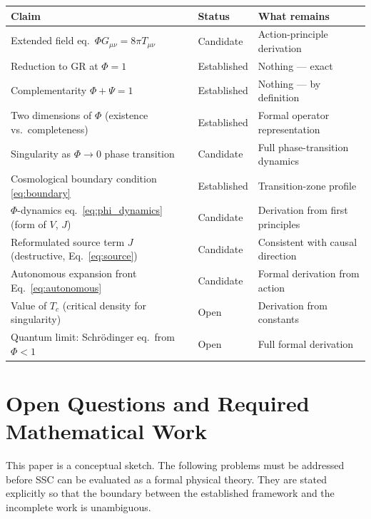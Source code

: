 \documentclass[12pt,a4paper]{article}
\begin{document}
\begin{center}
\renewcommand{\arraystretch}{1.35}
\begin{tabular}{p{5.2cm} l p{5.5cm}}
\toprule
\textbf{Claim} & \textbf{Status} & \textbf{What remains}\\
\midrule
Extended field eq.\ $\Phi G_{\mu\nu} = 8\pi T_{\mu\nu}$
  & Candidate & Action-principle derivation\\
Reduction to GR at $\Phi = 1$
  & Established & Nothing — exact\\
Complementarity $\Phi + \Psi = 1$
  & Established & Nothing — by definition\\
Two dimensions of $\Phi$ (existence vs.\ completeness)
  & Established & Formal operator representation\\
Singularity as $\Phi \to 0$ phase transition
  & Candidate & Full phase-transition dynamics\\
Cosmological boundary condition \eqref{eq:boundary}
  & Established & Transition-zone profile\\
$\Phi$-dynamics eq.\ \eqref{eq:phi_dynamics} (form of $V$, $J$)
  & Candidate & Derivation from first principles\\
Reformulated source term $J$ (destructive, Eq.~\ref{eq:source})
  & Candidate & Consistent with causal direction\\
Autonomous expansion front Eq.~\eqref{eq:autonomous}
  & Candidate & Formal derivation from action\\
Value of $T_c$ (critical density for singularity)
  & Open & Derivation from constants\\
Quantum limit: Schrödinger eq.\ from $\Phi < 1$
  & Open & Full formal derivation\\
\bottomrule
\end{tabular}
\end{center}

\section{Open Questions and Required Mathematical Work}
\label{sec:open}

This paper is a conceptual sketch.  The following problems must be
addressed before SSC can be evaluated as a formal physical theory.
They are stated explicitly so that the boundary between the established
framework and the incomplete work is unambiguous.
\end{document}
